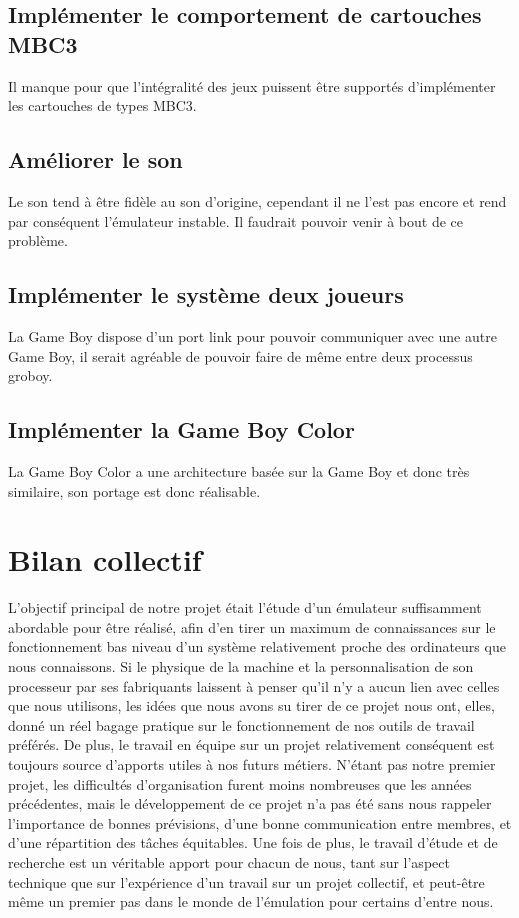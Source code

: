 \documentclass{report}
\begin{document}
\subsection*{Implémenter le comportement de cartouches MBC3}
Il manque pour que l'intégralité des jeux puissent être supportés d'implémenter les cartouches de types MBC3.
\subsection*{Améliorer le son}
Le son tend à être fidèle au son d'origine, cependant il ne l'est pas encore et rend par conséquent l'émulateur instable. Il faudrait pouvoir venir à bout de ce problème.
\subsection*{Implémenter le système deux joueurs}
La Game Boy dispose d'un port link pour pouvoir communiquer avec une autre Game Boy, il serait agréable de pouvoir faire de même entre deux processus groboy.
\subsection*{Implémenter la Game Boy Color}
La Game Boy Color a une architecture basée sur la Game Boy et donc très similaire, son portage est donc réalisable. 
\section*{Bilan collectif}
L'objectif principal de notre projet était l'étude d'un émulateur suffisamment abordable pour être réalisé, afin d'en tirer un maximum de connaissances sur le fonctionnement bas niveau d'un système relativement proche des ordinateurs que nous connaissons.
Si le physique de la machine et la personnalisation de son processeur par ses fabriquants laissent à penser qu'il n'y a aucun lien avec celles que nous utilisons, les idées que nous avons su tirer de ce projet nous ont, elles, donné un réel bagage pratique sur le fonctionnement de nos outils de travail préférés. 
De plus, le travail en équipe sur un projet relativement conséquent est toujours source d'apports utiles à nos futurs métiers. N'étant pas notre premier projet, les difficultés d'organisation furent moins nombreuses que les années précédentes, mais le développement de ce projet n'a pas été sans nous rappeler l'importance de bonnes prévisions, d'une bonne communication entre membres, et d'une répartition des tâches équitables.
Une fois de plus, le travail d'étude et de recherche est un véritable apport pour chacun de nous, tant sur l'aspect technique que sur l'expérience d'un travail sur un projet collectif, et peut-être même un premier pas dans le monde de l'émulation pour certains d'entre nous.
\end{document}
